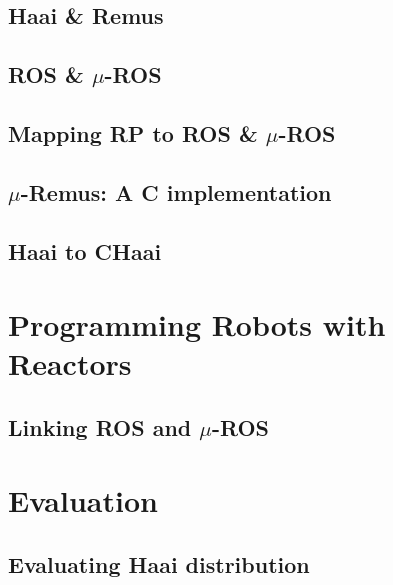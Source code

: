\documentclass[a4paper]{book}
\begin{document}
\section{Haai \& Remus}
\label{sec:haai-and-remus}
\section{ROS \& $\mu$-ROS}
\label{sec:ros-and-mu-ros}
\section{Mapping RP to ROS \& $\mu$-ROS}
\label{sec:mapping-rp-to-ros-and-mu-ros}
\section{$\mu$-Remus: A C implementation}
\label{sec:mu-remus-a-c-implementation}
\section{Haai to CHaai}
\label{sec:haai-to-chaai}
\chapter{Programming Robots with Reactors}
\label{ch:programming-robots-with-reactors}
\section{Linking ROS and $\mu$-ROS}
\label{sec:linking-ros-and-mu-ros}
\chapter{Evaluation}
\label{ch:evaluation}
\section{Evaluating Haai distribution}
\label{sec:evaluating-haai-distribution}
\end{document}
